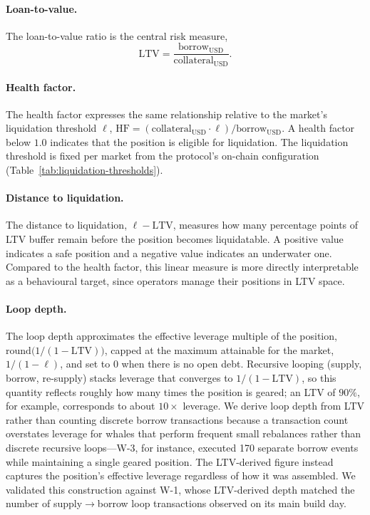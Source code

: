 \paragraph{Loan-to-value.}
The loan-to-value ratio is the central risk measure,
\[
\mathrm{LTV} = \frac{\text{borrow}_{\text{USD}}}{\text{collateral}_{\text{USD}}}.
\]

\paragraph{Health factor.}
The health factor expresses the same relationship relative to the
market's liquidation threshold $\ell$,
$\mathrm{HF} = (\text{collateral}_\text{USD} \cdot \ell) / \text{borrow}_\text{USD}$.
A health factor below $1.0$ indicates that the position is eligible for
liquidation. The liquidation threshold is fixed per market from the
protocol's on-chain configuration
(Table~\ref{tab:liquidation-thresholds}).

\paragraph{Distance to liquidation.}
The distance to liquidation, $\ell - \mathrm{LTV}$, measures how many
percentage points of LTV buffer remain before the position becomes
liquidatable. A positive value indicates a safe position and a negative
value indicates an underwater one. Compared to the health factor, this
linear measure is more directly interpretable as a behavioural target,
since operators manage their positions in LTV space.

\paragraph{Loop depth.}
The loop depth approximates the effective leverage multiple of the
position, $\mathrm{round}\big(1 / (1 - \mathrm{LTV})\big)$, capped at the
maximum attainable for the market,
$1 / (1 - \ell)$, and set to $0$ when there is no open debt. Recursive
looping (supply, borrow, re-supply) stacks leverage that converges to
$1/(1-\mathrm{LTV})$, so this quantity reflects roughly how many times
the position is geared; an LTV of $90\%$, for example, corresponds to
about $10\times$ leverage. We derive loop depth from LTV rather than
counting discrete borrow transactions because a transaction count
overstates leverage for whales that perform frequent small rebalances
rather than discrete recursive loops---W-3, for instance, executed 170
separate borrow events while maintaining a single geared position. The
LTV-derived figure instead captures the position's effective leverage
regardless of how it was assembled. We validated this construction
against W-1, whose LTV-derived depth matched the number of
supply$\rightarrow$borrow loop transactions observed on its main build
day.

